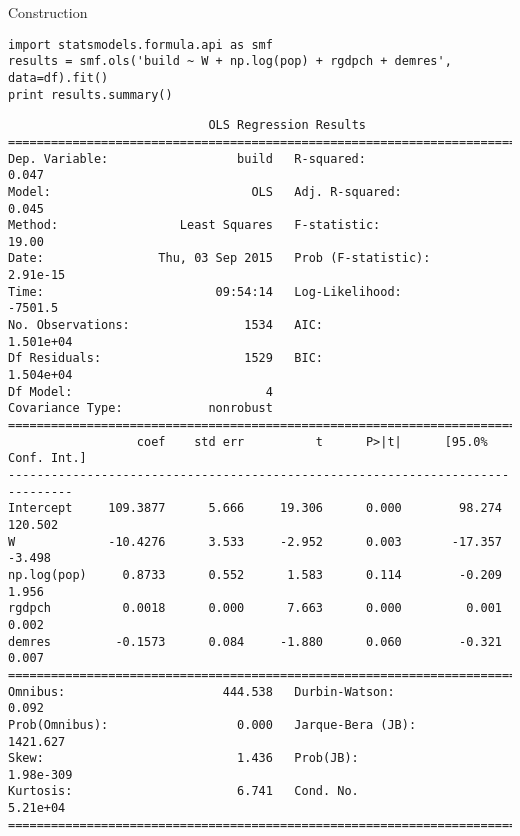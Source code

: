\documentclass[12pt,fleqn]{article}\usepackage{common}
\begin{document}

Construction

\begin{verbatim}
import statsmodels.formula.api as smf
results = smf.ols('build ~ W + np.log(pop) + rgdpch + demres', data=df).fit()
print results.summary()
\end{verbatim}

\begin{verbatim}
                            OLS Regression Results                            
==============================================================================
Dep. Variable:                  build   R-squared:                       0.047
Model:                            OLS   Adj. R-squared:                  0.045
Method:                 Least Squares   F-statistic:                     19.00
Date:                Thu, 03 Sep 2015   Prob (F-statistic):           2.91e-15
Time:                        09:54:14   Log-Likelihood:                -7501.5
No. Observations:                1534   AIC:                         1.501e+04
Df Residuals:                    1529   BIC:                         1.504e+04
Df Model:                           4                                         
Covariance Type:            nonrobust                                         
===============================================================================
                  coef    std err          t      P>|t|      [95.0% Conf. Int.]
-------------------------------------------------------------------------------
Intercept     109.3877      5.666     19.306      0.000        98.274   120.502
W             -10.4276      3.533     -2.952      0.003       -17.357    -3.498
np.log(pop)     0.8733      0.552      1.583      0.114        -0.209     1.956
rgdpch          0.0018      0.000      7.663      0.000         0.001     0.002
demres         -0.1573      0.084     -1.880      0.060        -0.321     0.007
==============================================================================
Omnibus:                      444.538   Durbin-Watson:                   0.092
Prob(Omnibus):                  0.000   Jarque-Bera (JB):             1421.627
Skew:                           1.436   Prob(JB):                    1.98e-309
Kurtosis:                       6.741   Cond. No.                     5.21e+04
==============================================================================
\end{verbatim}
\end{document}
